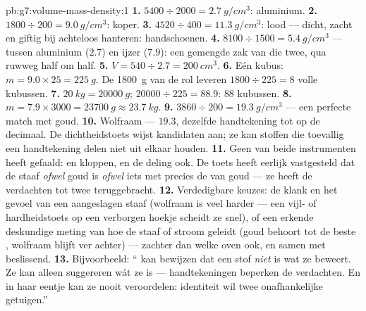 \begin{solution}{pb:g7:volume-mass-density:1}
\textbf{1.} $5400 \div 2000 = \qty{2.7}{g/cm^3}$: aluminium.
\textbf{2.} $1800 \div 200 = \qty{9.0}{g/cm^3}$: koper.
\textbf{3.} $4520 \div 400 = \qty{11.3}{g/cm^3}$: lood --- dicht,
zacht en giftig bij achteloos hanteren: handschoenen.
\textbf{4.} $8100 \div 1500 = \qty{5.4}{g/cm^3}$ --- tussen aluminium
($2.7$) en ijzer ($7.9$): een gemengde zak van die twee, qua
 ruwweg half om half.
\textbf{5.} $V = 540 \div 2.7 = \qty{200}{cm^3}$.
\textbf{6.} Eén kubus: $m = 9.0 \times 25 = \qty{225}{g}$. De
\qty{1800}{g} van de rol leveren $1800 \div 225 = 8$ volle kubussen.
\textbf{7.} $\qty{20}{kg} = \qty{20000}{g}$;
$20000 \div 225 = 88.9$: $88$ kubussen.
\textbf{8.} $m = 7.9 \times 3000 = \qty{23700}{g} \approx
\qty{23.7}{kg}$.
\textbf{9.} $3860 \div 200 = \qty{19.3}{g/cm^3}$ --- een perfecte
match met goud.
\textbf{10.} Wolfraam ---  $19.3$, dezelfde handtekening tot
op de decimaal. De dichtheidstoets wijst kandidaten aan; ze kan
stoffen die toevallig een handtekening delen niet uit elkaar houden.
\textbf{11.} Geen van beide instrumenten heeft gefaald:  en
 kloppen, en de deling ook. De toets heeft eerlijk vastgesteld
dat de staaf \emph{ofwel} goud is \emph{ofwel} iets met precies de
 van goud --- ze heeft de verdachten tot twee teruggebracht.
\textbf{12.} Verdedigbare keuzes: de klank en het gevoel van een
aangeslagen staaf (wolfraam is veel harder --- een vijl- of
hardheidstoets op een verborgen hoekje scheidt ze snel), of een erkende
deskundige meting van hoe de staaf  of stroom geleidt (goud
behoort tot de beste , wolfraam blijft ver achter) ---
zachter dan welke oven ook, en samen met  beslissend.
\textbf{13.} Bijvoorbeeld: `` kan bewijzen dat een stof
\emph{niet} is wat ze beweert. Ze kan alleen suggereren wát ze is ---
handtekeningen beperken de verdachten. En in haar eentje kan ze nooit
veroordelen: identiteit wil twee onafhankelijke getuigen.''
\end{solution}
